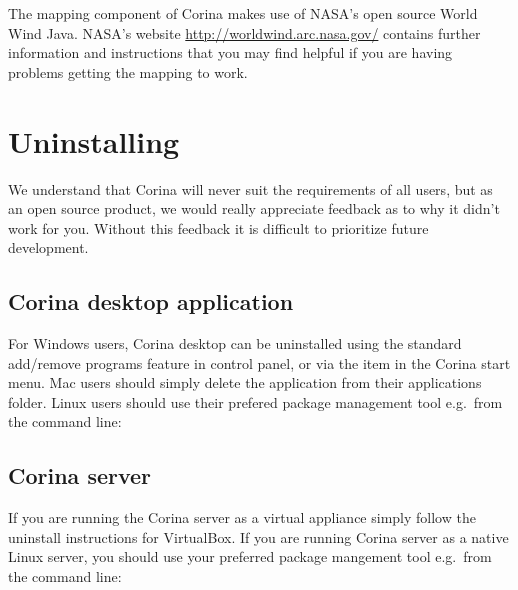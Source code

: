 The mapping component of Corina makes use of NASA's open source World Wind Java.  NASA's website \url{http://worldwind.arc.nasa.gov/} contains further information and instructions that you may find helpful if you are having problems getting the mapping to work.  

\section{Uninstalling}

We understand that Corina will never suit the requirements of all users, but as an open source product, we would really appreciate feedback as to why it didn't work for you.  Without this feedback it is difficult to prioritize future development.

\subsection{Corina desktop application}
For Windows users, Corina desktop can be uninstalled using the standard add/remove programs feature in control panel, or via the item in the Corina start menu.  Mac users should simply delete the application from their applications folder.  Linux users should use their prefered package management tool e.g.\ from the command line:

\subsection{Corina server}


If you are running the Corina server as a virtual appliance simply follow the uninstall instructions for VirtualBox.  If you are running Corina server as a native Linux server, you should use your preferred package mangement tool e.g.\ from the command line:








